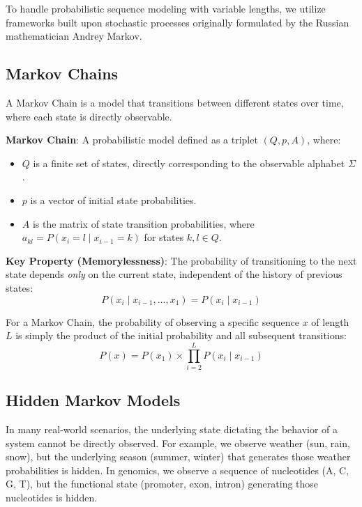 To handle probabilistic sequence modeling with variable lengths, we utilize frameworks built upon stochastic processes originally formulated by the Russian mathematician Andrey Markov. 

\subsection{Markov Chains}

A Markov Chain is a model that transitions between different states over time, where each state is directly observable. 

\begin{important}
\textbf{Markov Chain}: A probabilistic model defined as a triplet $(Q, p, A)$, where:
\begin{itemize}
    \item $Q$ is a finite set of states, directly corresponding to the observable alphabet $\Sigma$.
    \item $p$ is a vector of initial state probabilities.
    \item $A$ is the matrix of state transition probabilities, where $a_{kl} = P(x_i = l \mid x_{i-1} = k)$ for states $k, l \in Q$.
\end{itemize}
\textbf{Key Property (Memorylessness)}: The probability of transitioning to the next state depends \textit{only} on the current state, independent of the history of previous states: 
\[ P(x_i \mid x_{i-1}, \dots, x_1) = P(x_i \mid x_{i-1}) \]
\end{important}

For a Markov Chain, the probability of observing a specific sequence $x$ of length $L$ is simply the product of the initial probability and all subsequent transitions:
\begin{equation}
P(x) = P(x_1) \times \prod_{i=2}^{L} P(x_i \mid x_{i-1})
\label{eq:markov_prob}
\end{equation}

\subsection{Hidden Markov Models}

In many real-world scenarios, the underlying state dictating the behavior of a system cannot be directly observed. For example, we observe weather (sun, rain, snow), but the underlying season (summer, winter) that generates those weather probabilities is hidden. In genomics, we observe a sequence of nucleotides (A, C, G, T), but the functional state (promoter, exon, intron) generating those nucleotides is hidden.

